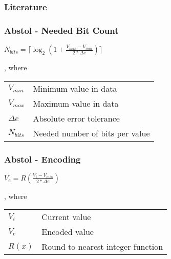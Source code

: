 \documentclass[compress]{beamer}
\begin{document}
\begin{frame}
	\frametitle{Literature}

	
	
\end{frame}

\appendix

\begin{frame}
	\frametitle{Abstol - Needed Bit Count}

	\begin{center}
		$N_{bits}=\lceil\log_2{\left(1 + \frac{V_{max} - V_{min}}{2 * \Delta{e}}\right)}\rceil$
	\end{center}

	\bigskip

	, where\\

	\bigskip

	\begin{tabular}{ll}
		$V_{min}$ & Minimum value in data \\
		$V_{max}$ & Maximum value in data \\
		$\Delta{e}$ & Absolute error tolerance \\
		$N_{bits}$ & Needed number of bits per value
	\end{tabular}

\end{frame}

\begin{frame}
	\frametitle{Abstol - Encoding}

	\begin{center}
		$V_e = R\left(\frac{V_i - V_{min}}{2 * \Delta{e}}\right)$
	\end{center}

	\bigskip

	, where\\

	\bigskip

	\begin{tabular}{ll}
		$V_i$ & Current value \\
		$V_e$ & Encoded value \\
		$R\left(x\right)$ & Round to nearest integer function
	\end{tabular}

\end{frame}
\end{document}
